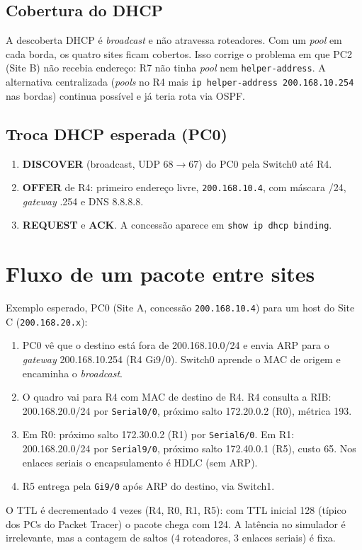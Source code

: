 \documentclass[12pt,a4paper]{article}
\begin{document}
\subsection{Cobertura do DHCP}
A descoberta DHCP é \textit{broadcast} e não atravessa roteadores. Com um \textit{pool} em cada borda, os quatro sites ficam cobertos. Isso corrige o problema em que PC2 (Site B) não recebia endereço: R7 não tinha \textit{pool} nem \texttt{helper-address}. A alternativa centralizada (\textit{pools} no R4 mais \texttt{ip helper-address 200.168.10.254} nas bordas) continua possível e já teria rota via OSPF.

\subsection{Troca DHCP esperada (PC0)}
\begin{enumerate}[nosep]
\item \textbf{DISCOVER} (broadcast, UDP 68$\to$67) do PC0 pela Switch0 até R4.
\item \textbf{OFFER} de R4: primeiro endereço livre, \texttt{200.168.10.4}, com máscara /24, \textit{gateway} .254 e DNS 8.8.8.8.
\item \textbf{REQUEST} e \textbf{ACK}. A concessão aparece em \texttt{show ip dhcp binding}.
\end{enumerate}

\section{Fluxo de um pacote entre sites}
Exemplo esperado, PC0 (Site A, concessão \texttt{200.168.10.4}) para um host do Site C (\texttt{200.168.20.x}):
\begin{enumerate}[nosep]
\item PC0 vê que o destino está fora de 200.168.10.0/24 e envia ARP para o \textit{gateway} 200.168.10.254 (R4 Gi9/0). Switch0 aprende o MAC de origem e encaminha o \textit{broadcast}.
\item O quadro vai para R4 com MAC de destino de R4. R4 consulta a RIB: 200.168.20.0/24 por \texttt{Serial0/0}, próximo salto 172.20.0.2 (R0), métrica 193.
\item Em R0: próximo salto 172.30.0.2 (R1) por \texttt{Serial6/0}. Em R1: 200.168.20.0/24 por \texttt{Serial9/0}, próximo salto 172.40.0.1 (R5), custo 65. Nos enlaces seriais o encapsulamento é HDLC (sem ARP).
\item R5 entrega pela \texttt{Gi9/0} após ARP do destino, via Switch1.
\end{enumerate}
O TTL é decrementado 4 vezes (R4, R0, R1, R5): com TTL inicial 128 (típico dos PCs do Packet Tracer) o pacote chega com 124. A latência no simulador é irrelevante, mas a contagem de saltos (4 roteadores, 3 enlaces seriais) é fixa.
\end{document}
